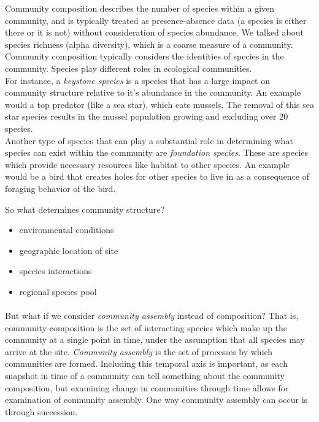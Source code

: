 \documentclass[12pt]{article}
\begin{document}
Community composition describes the number of species within a given community, and is typically treated as presence-absence data (a species is either there or it is not) without consideration of species abundance. We talked about species richness (alpha diversity), which is a coarse measure of a community. Community composition typically considers the identities of species in the community. Species play different roles in ecological communities. \\

For instance, a \textit{keystone species} is a species that has a large impact on community structure relative to it's abundance in the community. An example would a top predator (like a sea star), which eats mussels. The removal of this sea star species results in the mussel population growing and excluding over 20 species. \\

Another type of species that can play a substantial role in determining what species can exist within the community are \textit{foundation species}. These are species which provide necessary resources like habitat to other species. An example would be a bird that creates holes for other species to live in as a consequence of foraging behavior of the bird. 

So what determines community structure? 
\begin{itemize}
  \item environmental conditions
  \item geographic location of site
  \item species interactions
  \item regional species pool 
\end{itemize}




\paragraph*{}
But what if we consider \textit{community assembly} instead of composition? That is, community composition is the set of interacting species which make up the community at a single point in time, under the assumption that all species may arrive at the site. \textit{Community assembly} is the set of processes by which communities are formed. Including this temporal axis is important, as each snapshot in time of a community can tell something about the community composition, but examining change in communities through time allows for examination of community assembly. One way community assembly can occur is through succession.
\end{document}
